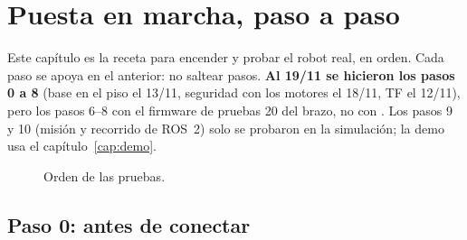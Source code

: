 \chapter{Puesta en marcha, paso a paso}\label{cap:marcha}

Este capítulo es la receta para encender y probar el robot real, en orden. Cada paso se apoya en el anterior: no
saltear pasos. \textbf{Al 19/11 se hicieron los pasos 0 a 8} (base en el piso el 13/11, seguridad con los motores el
18/11, TF el 12/11), pero los pasos 6--8 con el firmware de pruebas 20 del brazo, no con . Los
pasos 9 y 10 (misión y recorrido de ROS~2) solo se probaron en la simulación; la demo usa el capítulo~\ref{cap:demo}.

\begin{figure}[H]
\centering
{}
\caption{Orden de las pruebas.}
\end{figure}

\section{Paso 0: antes de conectar}

